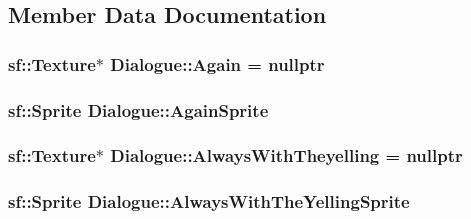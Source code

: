 \subsection{Member Data Documentation}
\subsubsection[{\texorpdfstring{Again}{Again}}]{\setlength{\rightskip}{0pt plus 5cm}sf\+::\+Texture$\ast$ Dialogue\+::\+Again = nullptr\hspace{0.3cm}{\ttfamily [protected]}}\hypertarget{classDialogue_a17f1839e3ebbca2cca847d53e9b958a1}{}\label{classDialogue_a17f1839e3ebbca2cca847d53e9b958a1}
\subsubsection[{\texorpdfstring{Again\+Sprite}{AgainSprite}}]{\setlength{\rightskip}{0pt plus 5cm}sf\+::\+Sprite Dialogue\+::\+Again\+Sprite\hspace{0.3cm}{\ttfamily [protected]}}\hypertarget{classDialogue_a98acbbe8f76ed3562e37481558913d21}{}\label{classDialogue_a98acbbe8f76ed3562e37481558913d21}
\subsubsection[{\texorpdfstring{Always\+With\+Theyelling}{AlwaysWithTheyelling}}]{\setlength{\rightskip}{0pt plus 5cm}sf\+::\+Texture$\ast$ Dialogue\+::\+Always\+With\+Theyelling = nullptr\hspace{0.3cm}{\ttfamily [protected]}}\hypertarget{classDialogue_a7744310841a2275354c458d8ec32463d}{}\label{classDialogue_a7744310841a2275354c458d8ec32463d}
\subsubsection[{\texorpdfstring{Always\+With\+The\+Yelling\+Sprite}{AlwaysWithTheYellingSprite}}]{\setlength{\rightskip}{0pt plus 5cm}sf\+::\+Sprite Dialogue\+::\+Always\+With\+The\+Yelling\+Sprite\hspace{0.3cm}{\ttfamily [protected]}}\hypertarget{classDialogue_a1eea5e12afbaad687a4eb3b17ddf1b3e}{}\label{classDialogue_a1eea5e12afbaad687a4eb3b17ddf1b3e}
